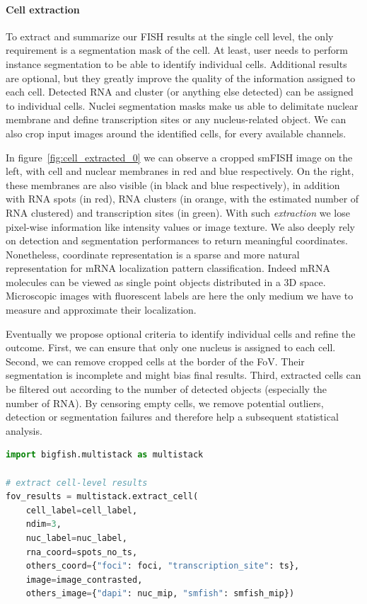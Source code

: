 \paragraph{Cell extraction}

To extract and summarize our \ac{FISH} results at the single cell level, the only requirement is a segmentation mask of the cell.
At least, user needs to perform instance segmentation to be able to identify individual cells.
Additional results are optional, but they greatly improve the quality of the information assigned to each cell.
Detected \ac{RNA} and cluster (or anything else detected) can be assigned to individual cells.
Nuclei segmentation masks make us able to delimitate nuclear membrane and define transcription sites or any nucleus-related object.
We can also crop input images around the identified cells, for every available channels.

In figure~\ref{fig:cell_extracted_0} we can observe a cropped \ac{smFISH} image on the left, with cell and nuclear membranes in red and blue respectively.
On the right, these membranes are also visible (in black and blue respectively), in addition with \ac{RNA} spots (in red), \ac{RNA} clusters (in orange, with the estimated number of \ac{RNA} clustered) and transcription sites (in green).
With such \emph{extraction} we lose pixel-wise information like intensity values or image texture.
We also deeply rely on detection and segmentation performances to return meaningful coordinates.
Nonetheless, coordinate representation is a sparse and more natural representation for \ac{mRNA} localization pattern classification.
Indeed \ac{mRNA} molecules can be viewed as single point objects distributed in a 3D space.
Microscopic images with fluorescent labels are here the only medium we have to measure and approximate their localization.

Eventually we propose optional criteria to identify individual cells and refine the outcome.
First, we can ensure that only one nucleus is assigned to each cell.
Second, we can remove cropped cells at the border of the \ac{FoV}.
Their segmentation is incomplete and might bias final results.
Third, extracted cells can be filtered out according to the number of detected objects (especially the number of \ac{RNA}).
By censoring empty cells, we remove potential outliers, detection or segmentation failures and therefore help a subsequent statistical analysis.\\

\begin{minipage}{0.9\textwidth}
\begin{lstlisting}[language=Python]
import bigfish.multistack as multistack

# extract cell-level results
fov_results = multistack.extract_cell(
    cell_label=cell_label,
    ndim=3,
    nuc_label=nuc_label,
    rna_coord=spots_no_ts,
    others_coord={"foci": foci, "transcription_site": ts},
    image=image_contrasted,
    others_image={"dapi": nuc_mip, "smfish": smfish_mip})
\end{lstlisting}
\end{minipage}

